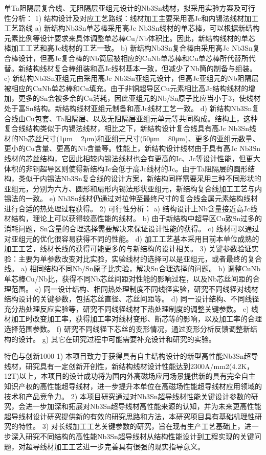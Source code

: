 \documentclass[12pt, a4paper]{ctexbook}
\begin{document}
单Ta阻隔层复合线、无阻隔层亚组元设计的Nb3Sn线材，拟采用实验方案及可行性分析：
1) 结构设计及对应工艺路线：线材加工主要采用高Jc和内锡法线材加工工艺路线
a) 新结构Nb3Sn单芯棒采用高Jc Nb3Sn线材的单芯棒，可以根据新结构元素比例等设计要求来具体调整单芯棒Cu/Nb体积比。因此，新结构线材的单芯棒加工工艺和高Jc线材的工艺一致。
b) 新结构Nb3Sn复合棒由采用高Jc Nb3Sn复合棒设计，但高Jc复合棒的Nb筒层被相应的CuNb单芯棒和Cu单芯棒所代替所代替。新结构线材复合棒组装和高Jc线材基本一致，但减少了Nb筒的制备与组装。
c) 新结构Nb3Sn亚组元由采用高Jc Nb3Sn亚组元设计，但高Jc亚组元的Nb阻隔层被相应的CuNb单芯棒和Cu填充。由于非铜超导区Cu元素相比高Jc结构线材的增加，更多的Sn会被多余的Cu消耗，因此亚组元的Nb/Sn原子比应当小于3，使线材处于富Sn结构。新结构线材亚组元制备和高Jc线材工艺一致。
d) 新结构Nb3Sn复合线由Cu包套、Ta阻隔层、以及无阻隔层亚组元单元等共同构成。结构上，这种复合线结构类似于内锡法线材，相比之下，新结构设计复合线具有高Jc Nb3Sn线材的Nb芯丝尺寸(1μm ~ 2μm)和亚组元尺寸(50μm ~ 80μm)、更多的亚组元数量、更小的Cu含量、更高的Nb含量等。性能上，新结构设计线材由于具有高Jc Nb3Sn线材的芯丝结构，它因此相较内锡法线材也会有更高的Ic、Jc等设计性能，但更大体积的非铜超导区则使得新结构Jc会低于高Jc线材的Jc。由于Ta阻隔层的圆形结构，类似于内锡法Nb3Sn复合线的设计方案，新结构同样需要采用三种不同形状的亚组元，分别为六方、圆形和扇形内锡法形状亚组元，新结构复合线加工工艺与内锡法的一致。
e) Nb3Sn线材仍通过对拉伸至最终尺寸的复合线金属元素结构线材进行合适的热处理过程获得。
2) 可行性分析：
a) 结构设计上Nb含量接近高Jc线材结构，理论上可以获得较高性能的线材。
b) 由于新结构中超导区Cu致Sn过多的消耗问题，Sn含量的合理选择需要解决来保证设计性能的获得。
c) 线材可以通过对亚组元的优化很容易获得不同的性能。
d) 加工工艺基本采用目前本单位成熟的加工工艺，线材长线的获得可能更多的与新结构的设计相关。
3) 关键参数验证实验：主要为单参数改变对比实验，实验线材的选择可以是亚组元，或者最终的复合线。
a) 相同结构不同Nb/Sn原子比实验，解决Sn合理选择的问题。
b) 调整CuNb单芯棒Cu/Nb比，获得不同Nb芯丝间距对性能的影响过程，以及Nb芯丝间距的合理范围。
c) 同一设计结构、相同热处理制度不同线径实验，研究不同线径对线材结构设计的关键参数，包括芯丝直径、芯丝间距等。
d) 同一设计结构、不同线径充分热处理反应实验等，研究不同线径线材下热处理制度的调整关键参数。
e) 线材加工时改变加工率，获得加工率对线材变形、断芯等的影响，以及加工率的合理选择范围参数。
f) 研究不同线径下芯丝的变形情况，通过变形分析反馈调整新结构的设计。
g) 其它在研究过程中可能需要补充设计和研究的实验。



特色与创新1000
        1) 本项目致力于获得具有自主结构设计的新型高性能Nb3Sn超导线材，研究具有一定创新开创性，新结构线材设计性能达到2300A/mm2(4.2K，12T)以上，本项目的设计成功将为国内外高磁场应用场景提供新的具有完全自主知识产权的高性能超导线材，进一步提升本单位在高磁场性能超导线材应用领域的技术和产品竞争力。
        2) 本项目研究通过对Nb3Sn超导线材性能关键设计参数的研究，会进一步加深和拓展对Nb3Sn超导线材高性能来源的认知，并为未来更高性能超导线材设计研究提供新的有效的研究思路和方法，本研究项目具有基础机理性研究的特性。
        3) 对长线加工工艺关键参数的研究，旨在现有生产工艺基础上，进一步深入研究不同结构的高性能Nb3Sn超导线材从结构性能设计到工程实现的关键问题，对超导线材加工工艺进一步完善具有很强的现实指导意义。
\end{document}
